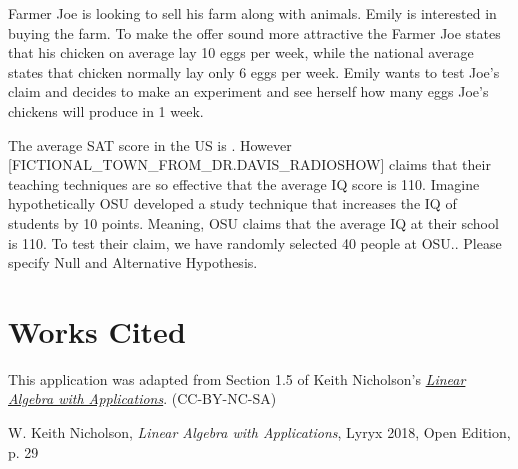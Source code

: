 \documentclass{ximera}
\begin{document}
\begin{example}
Farmer Joe is looking to sell his farm along with animals. Emily is interested in buying the farm. To make the offer sound more attractive the Farmer Joe states that his chicken on average lay 10 eggs per week, while the national average states that chicken normally lay only 6 eggs per week. Emily wants to test Joe’s claim and decides to make an experiment and see herself how many eggs Joe's chickens will produce in 1 week.
\end{example}


\begin{example}
The average SAT score in the US is . However [FICTIONAL_TOWN_FROM_DR.DAVIS_RADIOSHOW] claims that their teaching techniques are so effective that the average IQ score is 110. Imagine hypothetically OSU developed a study technique that increases the IQ of students by 10 points. Meaning, OSU claims that the average IQ at their school is 110. To test their claim, we have randomly selected 40 people at OSU.. Please specify Null and Alternative Hypothesis.

\end{example}

\begin{example}
\end{example}

\begin{enumerate}
\end{enumerate}

\begin{explanation}
\end{explanation}
  
\begin{exploration}
\end{exploration}

\begin{definition}
\end{definition}








\section*{Works Cited} This application was adapted from Section 1.5 of Keith Nicholson's \href{https://open.umn.edu/opentextbooks/textbooks/linear-algebra-with-applications}{\it Linear Algebra with Applications}. (CC-BY-NC-SA)
 
W. Keith Nicholson, {\it Linear Algebra with Applications}, Lyryx 2018, Open Edition, p. 29
\end{document}
